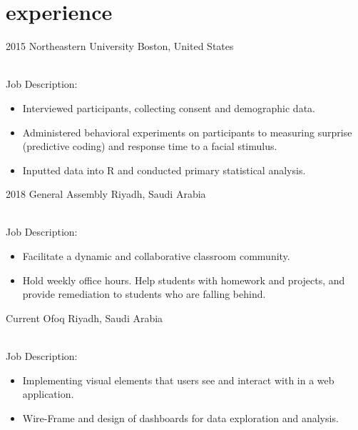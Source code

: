 \documentclass[]{cv-style}          %
\begin{document}

\section{experience}

\begin{entrylist}
\entry
  {2015}
  {Northeastern University}
  {Boston, United States}
  {\\
  Job Description:
\begin{itemize}
\item Interviewed participants, collecting consent and demographic data. 
\item Administered behavioral experiments on participants to measuring surprise (predictive coding) and response time to a facial stimulus. 
\item Inputted data into R and conducted primary statistical analysis. 
  \end{itemize}}
\entry
  {2018}
  {General Assembly}
  {Riyadh, Saudi Arabia}
  {\\
  Job Description:
\begin{itemize}
\item Facilitate a dynamic and collaborative classroom community.
\item Hold weekly office hours. Help students with homework and projects, and provide remediation to students who are falling behind.
  \end{itemize}}
\entry
  {Current}
  {Ofoq}
  {Riyadh, Saudi Arabia}
  {\\
  Job Description:
\begin{itemize}
\item Implementing visual elements that users see and interact with in a web application.
\item Wire-Frame and design of dashboards for data exploration and analysis.
  \end{itemize}}
 
\end{entrylist}
\end{document}

